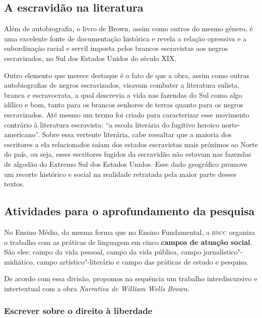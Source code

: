 \documentclass[11pt]{extarticle}
\begin{document}
\subsection{A escravidão na literatura}

Além de autobiografia, o livro de Brown, assim como outros do mesmo
gênero, é uma excelente fonte de documentação histórica e revela a
relação opressiva e a subordinação racial e servil imposta pelos brancos
escravistas aos negros escravizados, no Sul dos Estados Unidos do século
XIX.

Outro elemento que merece destaque é o fato de que a obra, assim como
outras autobiografias de negros escravizados, visavam combater a
literatura sulista, branca e escravocrata, a qual descrevia a vida nas
fazendas do Sul como algo idílico e bom, tanto para os brancos senhores
de terras quanto para os negros escravizados. Até mesmo um termo foi
criado para caracterizar esse movimento contrário à literatura
escravista: ``a escola literária do fugitivo heroico norte-americano''.
Sobre essa vertente literária, cabe ressaltar que a maioria dos
escritores a ela relacionados saíam dos estados escravistas mais
próximos ao Norte do país, ou seja, esses escritores fugidos da
escravidão não estavam nas fazendas de algodão do Extremo Sul dos
Estados Unidos. Esse dado geográfico promove um recorte histórico e
social na realidade retratada pela maior parte desses textos.

\subsection{Atividades para o aprofundamento da pesquisa}


No Ensino Médio, da mesma forma que no Ensino Fundamental, a \textsc{bncc}
organiza o trabalho com as práticas de linguagem em cinco \textbf{campos
de atuação social}. São eles: campo da vida pessoal, campo da vida
pública, campo jornalístico"-midiático, campo artístico"-literário e campo
das práticas de estudo e pesquisa.

De acordo com essa divisão, propomos na sequência um trabalho
interdiscursivo e intertextual com a obra \emph{Narrativa de William
Wells Brown.}

\subsubsection{Escrever sobre o direito à liberdade}
\end{document}
